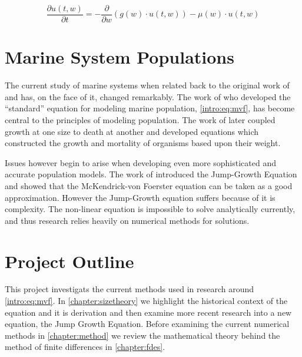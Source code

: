 \documentclass[../main]{subfiles}
\begin{document}
  \begin{equation} \label{intro:eq:mvf}
    \frac{\partial u(t, w)}{\partial t} = - \frac{\partial}{\partial w} \left(g(w) \cdot u(t, w) \right) - \mu(w) \cdot u(t, w)
  \end{equation}

  \section{Marine System Populations}
  The current study of marine systems when related back to the original work of \cite{mckendrick1926} and \cite{foerster1959} has, on the face of it, changed remarkably. The work of \cite{silvert1978} who developed the ``standard'' equation for modeling marine population, \autoref{intro:eq:mvf}, has become central to the principles of modeling population. The work of \cite{silvert1980} later coupled growth at one size to death at another and developed equations which constructed the growth and mortality of organisms based upon their weight.

  Issues however begin to arise when developing even more sophisticated and accurate population models. The work of \cite{datta2010} introduced the Jump-Growth Equation and showed that the McKendrick-von Foerster equation can be taken as a good approximation. However the Jump-Growth equation suffers because of it is complexity. The non-linear equation is impossible to solve analytically currently, and thus research relies heavily on numerical methods for solutions.

  \section{Project Outline}
  This project investigats the current methods used in research around \autoref{intro:eq:mvf}. In \autoref{chapter:sizetheory} we highlight the historical context of the equation and it is derivation and then examine more recent research into a new equation, the Jump Growth Equation. Before examining the current numerical methods in \autoref{chapter:method} we review the mathematical theory behind the method of finite differences in \autoref{chapter:fdes}.
\end{document}
